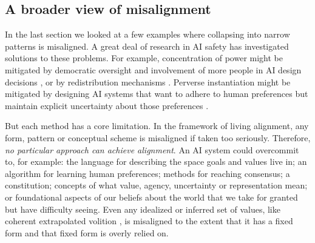 \documentclass[11pt]{article}
\begin{document}

\subsection{A broader view of misalignment}

In the last section we looked at a few examples where collapsing into narrow patterns is misaligned. A great deal of research in AI safety has investigated solutions to these problems. For example, concentration of power might be mitigated by democratic oversight and involvement of more people in AI design decisions \citep{birhane2022power, sloane2022participation, selbst2019fairness, lazar2023ai, dafoe2018ai, openai2023democratic}, or by redistribution mechanisms \citep{okeefe2020windfall, sharp2025agentic, gough2019universal, susskind2020world}. Perverse instantiation might be mitigated by designing AI systems that want to adhere to human preferences but maintain explicit uncertainty about those preferences \citep{russell2019human, hadfieldmenell2017off, hadfieldmenell2016cooperative, shah2020benefits, jeon2020reward}. 

But each method has a core limitation. In the framework of living alignment, any form, pattern or conceptual scheme is misaligned if taken too seriously. Therefore, \textit{no particular approach can achieve alignment}. An AI system could overcommit to, for example: the language for describing the space goals and values live in; an algorithm for learning human preferences; methods for reaching consensus; a constitution; concepts of what value, agency, uncertainty or representation mean; or foundational aspects of our beliefs about the world that we take for granted but have difficulty seeing. Even any idealized or inferred set of values, like coherent extrapolated volition \citep{yudkowsky2004coherent}, is misaligned to the extent that it has a fixed form and that fixed form is overly relied on.



\end{document}

